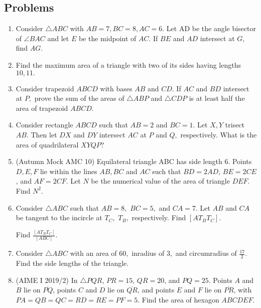 \subsection{Problems}

\begin{enumerate}

    \item Consider $\triangle ABC$ with $AB=7,BC=8,AC=6.$ Let AD be the angle bisector of $\angle BAC$ and let $E$ be the midpoint of $AC.$ If $BE$ and $AD$ intersect at $G,$ find $AG.$

    \item Find the maximum area of a triangle with two of its sides having lengths $10,11.$

    \item Consider trapezoid $ABCD$ with bases $AB$ and $CD.$ If $AC$ and $BD$ intersect at $P,$ prove the sum of the areas of $\triangle ABP$ and $\triangle CDP$ is at least half the area of trapezoid $ABCD.$
    
    \item Consider rectangle $ABCD$ such that $AB=2$ and $BC=1.$ Let $X,Y$ trisect $AB.$ Then let $DX$ and $DY$ intersect $AC$ at $P$ and $Q,$ respectively. What is the area of quadrilateral $XYQP?$

    \item (Autumn Mock AMC 10) Equilateral triangle ABC has side length $6$. Points $D, E, F$ lie within the lines $AB, BC$ and $AC$ such that $BD=2AD$, $BE=2CE$, and $AF=2CF$. Let $N$ be the numerical value of the area of triangle $DEF$. Find $N^2$.
    
    \item Consider $\triangle ABC$ such that $AB=8,$ $BC=5,$ and $CA=7.$ Let $AB$ and $CA$ be tangent to the incircle at $T_C,$ $T_B,$ respectively. Find $[AT_BT_C].$
    \begin{hint}
    \begin{addhint}
    {Find $\frac{[AT_BT_C]}{[ABC]}.$}
    \end{addhint}
    \end{hint}
    
    \item Consider $\triangle ABC$ with an area of $60,$ inradius of $3,$ and circumradius of $\frac{17}{2}.$ Find the side lengths of the triangle.
    
    \item (AIME I 2019/2) In $\triangle PQR$, $PR=15$, $QR=20$, and $PQ=25$. Points $A$ and $B$ lie on $\overline{PQ}$, points $C$ and $D$ lie on $\overline{QR}$, and points $E$ and $F$ lie on $\overline{PR}$, with $PA=QB=QC=RD=RE=PF=5$. Find the area of hexagon $ABCDEF$.
    

\end{enumerate}
